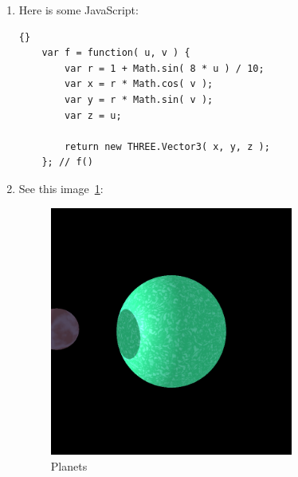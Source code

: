 \documentclass[twoside]{article}
\begin{document}
\begin{enumerate}
  \item Here is some JavaScript:

  \begin{lstlisting}{}
    var f = function( u, v ) {
        var r = 1 + Math.sin( 8 * u ) / 10;
        var x = r * Math.cos( v );
        var y = r * Math.sin( v );
        var z = u;

        return new THREE.Vector3( x, y, z );
    }; // f()
    \end{lstlisting}

  \item See this image~\ref{planets}:

  \begin{figure}
  \begin{center}
    \includegraphics[width=8cm]{planets}
    \end{center}
    \caption{Planets}
    \label{planets}
    \end{figure}

  \end{enumerate}
\end{document}
